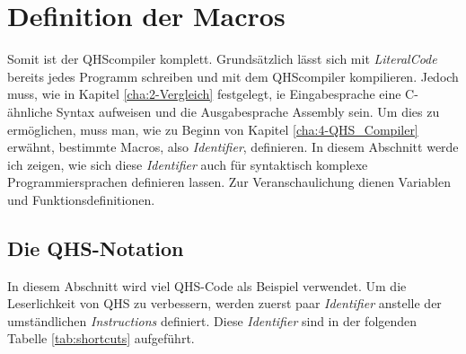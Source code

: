 \section{Definition der Macros} \label{sec:qhs-macro_definitions}
Somit ist der QHScompiler komplett. Grundsätzlich lässt sich mit \textit{LiteralCode} bereits jedes Programm schreiben und mit dem QHScompiler kompilieren. 
Jedoch muss, wie in Kapitel \ref{cha:2-Vergleich} festgelegt, ie Eingabesprache eine C-ähnliche Syntax aufweisen und die Ausgabesprache Assembly sein.
Um dies zu ermöglichen, muss man, wie zu Beginn von Kapitel \ref{cha:4-QHS_Compiler} erwähnt, bestimmte Macros, also \textit{Identifier}, definieren.
In diesem Abschnitt werde ich zeigen, wie sich diese \textit{Identifier} auch für syntaktisch komplexe Programmiersprachen definieren lassen.
Zur Veranschaulichung dienen Variablen und Funktionsdefinitionen.

\subsection{Die QHS-Notation} \label{sec:qhs-notation}
In diesem Abschnitt wird viel QHS-Code als Beispiel verwendet.
Um die Leserlichkeit von QHS zu verbessern, werden zuerst paar \textit{Identifier} anstelle der umständlichen \textit{Instructions} definiert.
Diese \textit{Identifier} sind in der folgenden Tabelle \ref{tab:shortcuts} aufgeführt.

